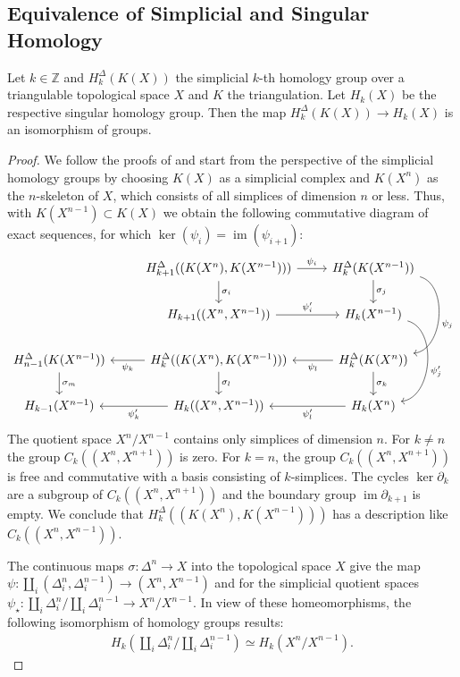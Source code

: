 \documentclass[envcountsect,runningheads]{llncs}
\DeclareMathOperator{\Ima}{im}
\begin{document}
\subsection{Equivalence of Simplicial and Singular Homology}
\label{simplicialsingularequivalence}
\begin{theorem}{\cite[p.~128]{hatcher2002algebraic}}
Let $k \in \mathbb{Z}$ and $H^\Delta_k(K(X))$ the simplicial $k$-th homology group over a triangulable topological space $X$ and $K$ the triangulation. Let $H_k(X)$ be the respective singular homology group. Then the map $H^{\Delta}_k(K(X)) \rightarrow H_k(X)$ is an isomorphism of groups.
\end{theorem}

\begin{proof}
We follow the proofs of \cite[p.~128, pp.~190-192]{hatcher2002algebraic,munkres2018elements} and start from the perspective of the simplicial homology groups by choosing $K(X)$ as a simplicial complex and $K(X^n)$ as the $n$-skeleton of $X$, which consists of all simplices of dimension $n$ or less. Thus, with $K(X^{n-1}) \subset K(X)$ we obtain the following commutative diagram of exact sequences, for which $\ker(\psi_i) = \Ima(\psi_{i+1})$:
\[
\begin{tikzcd}
& {H^{\Delta}_{k+1}((K(X^n),K(X^{n-1})))} \arrow[d, "\sigma_i"] \arrow[r, "\psi_i"]
& H^{\Delta}_{k}(K(X^{n-1})) \arrow[d, "\sigma_j"] \arrow[dd, bend left=80, "\psi_j"] \\
& {H_{k+1}((X^n,X^{n-1}))} \arrow[r, "\psi'_i"]
& H_{k}(X^{n-1}) \arrow[dd, bend left=80, "\psi'_j"]\\
H^{\Delta}_{n-1}(K(X^{n-1})) \arrow[d, "\sigma_m"]
& {H^{\Delta}_{k}((K(X^n),K(X^{n-1})))} \arrow[l,"\psi_k"] \arrow[d, "\sigma_l"]
& H^{\Delta}_{k}(K(X^n)) \arrow[l, "\psi_l"] \arrow[d, "\sigma_k"]\\
H_{k-1}(X^{n-1})
& {H_{k}((X^n,X^{n-1}))} \arrow[l,"\psi'_k"]
& H_{k}(X^{n}) \arrow[l,"\psi'_l"]
\end{tikzcd}
\]
The quotient space $X^n/X^{n-1}$ contains only simplices of dimension $n$. For $k \neq n$ the group $C_k((X^n,X^{n+1}))$ is zero. For $k = n$, the group $C_k((X^n,X^{n+1}))$ is free and commutative with a basis consisting of $k$-simplices. The cycles $\ker \partial_k$ are a subgroup of $C_k((X^n,X^{n+1}))$ and the boundary group $\Ima \partial_{k+1}$ is empty. We conclude that $H^{\Delta}_k((K(X^n),K(X^{n-1})))$ has a description like $C_k((X^n,X^{n-1}))$.

The continuous maps $\sigma: \Delta^n \rightarrow X$ into the topological space $X$ give the map $\psi: \coprod_i(\Delta^n_i,\Delta^{n-1}_i) \rightarrow (X^n,X^{n-1})$ and for the simplicial quotient spaces $\psi_{\star}: \coprod_i \Delta^n_i / \coprod_i \Delta^{n-1}_i \rightarrow X^n/X^{n-1}$. In view of these homeomorphisms, the following isomorphism of homology groups results:
\begin{align}
	H_k(\coprod_i \Delta^n_i / \coprod_i \Delta^{n-1}_i) \simeq H_k(X^n / X^{n-1}).
\end{align}


\end{proof}
\end{document}
